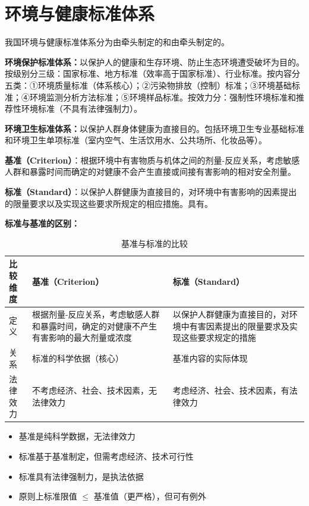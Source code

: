 \section{环境与健康标准体系}

我国环境与健康标准体系分为由牵头制定的和由牵头制定的。

\textbf{环境保护标准体系：}以保护人的健康和生存环境、防止生态环境遭受破坏为目的。按级别分三级：国家标准、地方标准（效率高于国家标准）、行业标准。按内容分五类：①环境质量标准（体系核心）；②污染物排放（控制）标准；③环境基础标准；④环境监测分析方法标准；⑤环境样品标准。按效力分：强制性环境标准和推荐性环境标准（不具有法律强制力）。

\textbf{环境卫生标准体系：}以保护人群身体健康为直接目的。包括环境卫生专业基础标准和环境卫生单项标准（室内空气、生活饮用水、公共场所、化妆品等）。

\begin{defbox}
\textbf{基准（Criterion）}：根据环境中有害物质与机体之间的剂量-反应关系，考虑敏感人群和暴露时间而确定的对健康不会产生直接或间接有害影响的相对安全剂量。

\textbf{标准（Standard）}：以保护人群健康为直接目的，对环境中有害影响的因素提出的限量要求以及实现这些要求所规定的相应措施。具有。
\end{defbox}

\begin{keybox}
\textbf{标准与基准的区别：}

\begin{table}[H]
\centering
\caption{基准与标准的比较}
\begin{tabularx}{\textwidth}{lXX}
\hline
\textbf{比较维度} & \textbf{基准（Criterion）} & \textbf{标准（Standard）} \\
\hline
定义 & 根据剂量-反应关系，考虑敏感人群和暴露时间，确定的对健康不产生有害影响的最大剂量或浓度 & 以保护人群健康为直接目的，对环境中有害因素提出的限量要求及实现这些要求规定的措施 \\
关系 & 标准的科学依据（核心） & 基准内容的实际体现 \\
法律效力 & 不考虑经济、社会、技术因素，无法律效力 & 考虑经济、社会、技术因素，有法律效力 \\
\hline
\end{tabularx}
\end{table}

\begin{itemize}[leftmargin=*]
    \item 基准是纯科学数据，无法律效力
    \item 标准基于基准制定，但需考虑经济、技术可行性
    \item 标准具有法律强制力，是执法依据
    \item 原则上标准限值 $\leq$ 基准值（更严格），但可有例外
\end{itemize}
\end{keybox}

